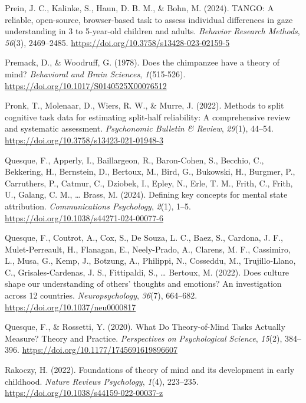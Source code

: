 \documentclass[
]{scrbook}
\newlength{\cslhangindent}
\newenvironment{CSLReferences}[2] %
 {\begin{list}{}{%
  \setlength{\itemindent}{0pt}
  \setlength{\leftmargin}{0pt}
  \setlength{\parsep}{0pt}
  \ifodd #1
   \setlength{\leftmargin}{\cslhangindent}
   \setlength{\itemindent}{-1\cslhangindent}
  \fi
  \setlength{\itemsep}{#2\baselineskip}}}
 {\end{list}}
\begin{document}
\begin{CSLReferences}{1}{0}
Prein, J. C., Kalinke, S., Haun, D. B. M., \& Bohn, M. (2024). {TANGO}: {A} reliable, open-source, browser-based task to assess individual differences in gaze understanding in 3 to 5-year-old children and adults. \emph{Behavior Research Methods}, \emph{56}(3), 2469--2485. \url{https://doi.org/10.3758/s13428-023-02159-5}

Premack, D., \& Woodruff, G. (1978). Does the chimpanzee have a theory of mind? \emph{Behavioral and Brain Sciences}, \emph{1}(515-526). \url{https://doi.org/10.1017/S0140525X00076512}

Pronk, T., Molenaar, D., Wiers, R. W., \& Murre, J. (2022). Methods to split cognitive task data for estimating split-half reliability: {A} comprehensive review and systematic assessment. \emph{Psychonomic Bulletin \& Review}, \emph{29}(1), 44--54. \url{https://doi.org/10.3758/s13423-021-01948-3}

Quesque, F., Apperly, I., Baillargeon, R., Baron-Cohen, S., Becchio, C., Bekkering, H., Bernstein, D., Bertoux, M., Bird, G., Bukowski, H., Burgmer, P., Carruthers, P., Catmur, C., Dziobek, I., Epley, N., Erle, T. M., Frith, C., Frith, U., Galang, C. M., \ldots{} Brass, M. (2024). Defining key concepts for mental state attribution. \emph{Communications Psychology}, \emph{2}(1), 1--5. \url{https://doi.org/10.1038/s44271-024-00077-6}

Quesque, F., Coutrot, A., Cox, S., De Souza, L. C., Baez, S., Cardona, J. F., Mulet-Perreault, H., Flanagan, E., Neely-Prado, A., Clarens, M. F., Cassimiro, L., Musa, G., Kemp, J., Botzung, A., Philippi, N., Cosseddu, M., Trujillo-Llano, C., Grisales-Cardenas, J. S., Fittipaldi, S., \ldots{} Bertoux, M. (2022). Does culture shape our understanding of others' thoughts and emotions? {An} investigation across 12 countries. \emph{Neuropsychology}, \emph{36}(7), 664--682. \url{https://doi.org/10.1037/neu0000817}

Quesque, F., \& Rossetti, Y. (2020). What {Do Theory-of-Mind Tasks Actually Measure}? {Theory} and {Practice}. \emph{Perspectives on Psychological Science}, \emph{15}(2), 384--396. \url{https://doi.org/10.1177/1745691619896607}

Rakoczy, H. (2022). Foundations of theory of mind and its development in early childhood. \emph{Nature Reviews Psychology}, \emph{1}(4), 223--235. \url{https://doi.org/10.1038/s44159-022-00037-z}


\end{CSLReferences}
\end{document}
